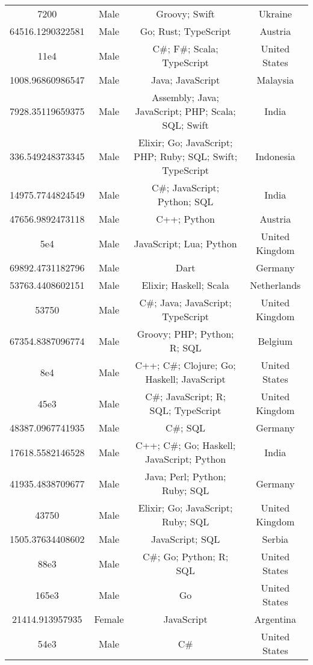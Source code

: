 \begin{center}
\begin{tabular}{ |c|c|c|c| }
7200  &  Male  &  Groovy; Swift  &  Ukraine  \\ 
64516.1290322581  &  Male  &  Go; Rust; TypeScript  &  Austria  \\ 
11e4  &  Male  &  C\#; F\#; Scala; TypeScript  &  United States  \\ 
1008.96860986547  &  Male  &  Java; JavaScript  &  Malaysia  \\ 
7928.35119659375  &  Male  &  Assembly; Java; JavaScript; PHP; Scala; SQL; Swift  &  India  \\ 
336.549248373345  &  Male  &  Elixir; Go; JavaScript; PHP; Ruby; SQL; Swift; TypeScript  &  Indonesia  \\ 
14975.7744824549  &  Male  &  C\#; JavaScript; Python; SQL  &  India  \\ 
47656.9892473118  &  Male  &  C++; Python  &  Austria  \\ 
5e4  &  Male  &  JavaScript; Lua; Python  &  United Kingdom  \\ 
69892.4731182796  &  Male  &  Dart  &  Germany  \\ 
53763.4408602151  &  Male  &  Elixir; Haskell; Scala  &  Netherlands  \\ 
53750  &  Male  &  C\#; Java; JavaScript; TypeScript  &  United Kingdom  \\ 
67354.8387096774  &  Male  &  Groovy; PHP; Python; R; SQL  &  Belgium  \\ 
8e4  &  Male  &  C++; C\#; Clojure; Go; Haskell; JavaScript  &  United States  \\ 
45e3  &  Male  &  C\#; JavaScript; R; SQL; TypeScript  &  United Kingdom  \\ 
48387.0967741935  &  Male  &  C\#; SQL  &  Germany  \\ 
17618.5582146528  &  Male  &  C++; C\#; Go; Haskell; JavaScript; Python  &  India  \\ 
41935.4838709677  &  Male  &  Java; Perl; Python; Ruby; SQL  &  Germany  \\ 
43750  &  Male  &  Elixir; Go; JavaScript; Ruby; SQL  &  United Kingdom  \\ 
1505.37634408602  &  Male  &  JavaScript; SQL  &  Serbia  \\ 
88e3  &  Male  &  C\#; Go; Python; R; SQL  &  United States  \\ 
165e3  &  Male  &  Go  &  United States  \\ 
21414.913957935  &  Female  &  JavaScript  &  Argentina  \\ 
54e3  &  Male  &  C\#  &  United States  \\ 

\end{tabular}
\end{center}
